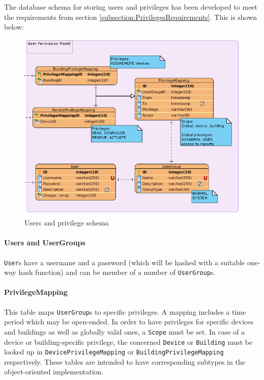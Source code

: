 \documentclass{report}
\begin{document}
The database schema for storing users and privileges has been developed to meet the requirements from section \ref{subsection:PrivilegesRequirements}. This is shown below:

\begin{figure}[H]
    \centering
    \includegraphics[width=\textwidth]{figures/db_user_schema}
    \caption{Users and privilege schema}
\end{figure}

\paragraph{Users and UserGroups}
\texttt{User}s have a username and a password (which will be hashed with a suitable one-way hash function) and can be member of a number of \texttt{UserGroup}s. 

\paragraph{PrivilegeMapping}
This table maps \texttt{UserGroup}s to specific privileges. A mapping includes a time period which may be open-ended. In order to have privileges for specific devices and buildings as well as globally valid ones, a \texttt{Scope} must be set. In case of a device or building-specific privilege, the concerned \texttt{Device} or \texttt{Building} must be looked up in \texttt{DevicePrivilegeMapping} or \texttt{BuildingPrivilegeMapping} respectively. These tables are intended to have corresponding subtypes in the object-oriented implementation.
\end{document}
